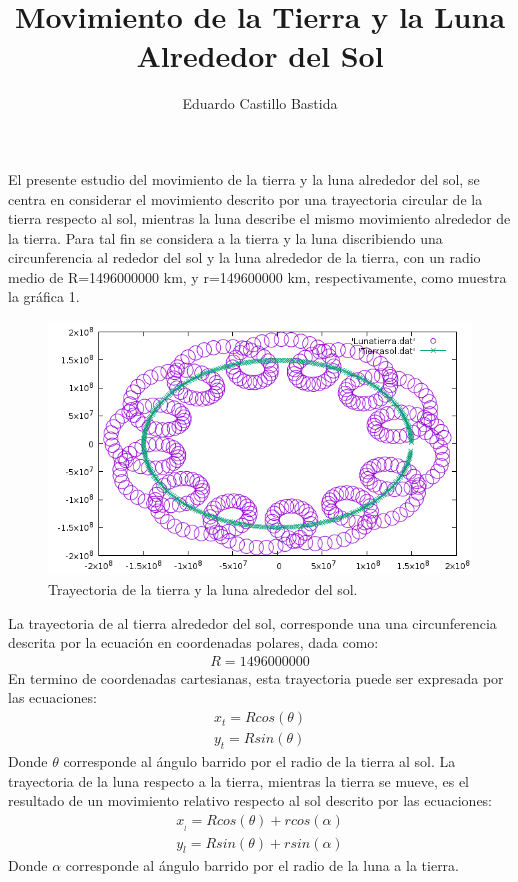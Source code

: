 \documentclass[12pt,a4paper,twoside]{article}
\author{Eduardo Castillo Bastida}
\title{\textbf{Movimiento de la Tierra y la Luna Alrededor del Sol}}
\begin{document}
\maketitle
El presente estudio del movimiento de la tierra y la luna alrededor del sol, se centra en considerar el movimiento descrito por una trayectoria circular de la tierra respecto al sol, mientras la luna describe el mismo movimiento alrededor de la tierra. Para tal fin se considera a la tierra y la luna discribiendo una circunferencia al rededor del sol y la luna alrededor de la tierra, con un radio medio de R=1496000000 km, y r=149600000 km, respectivamente, como muestra la gráfica 1. 
\begin{figure}[htbp]
\centering
\includegraphics[width=12cm]{Sistema.png}
\caption{Trayectoria de la tierra y la luna alrededor del sol.}\label{fig:figura1}
\end{figure}
La trayectoria de al tierra alrededor del sol, corresponde una una circunferencia descrita por la ecuación en coordenadas polares, dada como:
\begin{eqnarray}
R=1496000000
\end{eqnarray}
En termino de coordenadas cartesianas, esta trayectoria puede ser expresada por las ecuaciones:
\begin{eqnarray}
x_{t}=Rcos(\theta)\\
y_{t}=Rsin(\theta)
\end{eqnarray}
Donde $\theta$ corresponde al ángulo barrido por el radio de la tierra al sol.
La trayectoria de la luna respecto a la tierra, mientras la tierra se mueve, es el resultado de un movimiento relativo respecto al sol descrito por las ecuaciones:
\begin{eqnarray}
x_{_{l}}=Rcos(\theta)+rcos(\alpha)\\
y_{l}=Rsin(\theta)+rsin(\alpha)
\end{eqnarray}
Donde $\alpha$ corresponde al ángulo barrido por el radio de la luna a la tierra.
\end{document}
